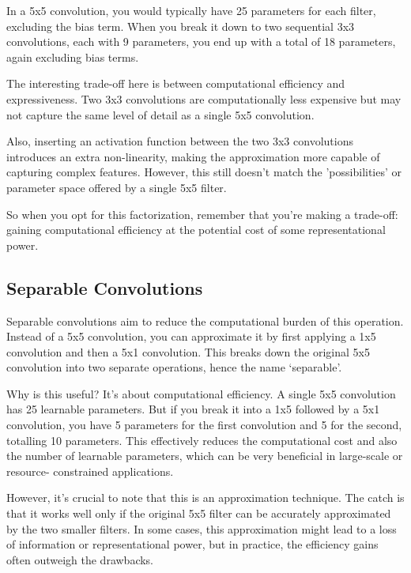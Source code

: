\documentclass[11pt]{article}
\begin{document}
In a 5x5 convolution, you would typically have 25 parameters for each filter, excluding the bias term. When you break it down to two sequential 3x3 convolutions, each with 9 parameters, you end up with a total of 18 parameters, again excluding bias terms. 

The interesting trade-off here is between computational efficiency and expressiveness. Two 3x3 convolutions are computationally less expensive but may not capture the same level of detail as a single 5x5 convolution. 

Also, inserting an activation function between the two 3x3 convolutions introduces an extra non-linearity, making the approximation more capable of capturing complex features. However, this still doesn't match the 'possibilities' or parameter space offered by a single 5x5 filter. 

So when you opt for this factorization, remember that you're making a trade-off: gaining computational efficiency at the potential cost of some representational power.

\subsection{Separable Convolutions}

Separable convolutions aim to reduce the computational burden of this operation. Instead of a 5x5 convolution, you can approximate it by first applying a 1x5 convolution and then a 5x1 convolution. This breaks down the original 5x5 convolution into two separate operations, hence the name `separable'. 

Why is this useful? It's about computational efficiency. A single 5x5 convolution has 25 learnable parameters. But if you break it into a 1x5 followed by a 5x1 convolution, you have 5 parameters for the first convolution and 5 for the second, totalling 10 parameters. This effectively reduces the computational cost and also the number of learnable parameters, which can be very beneficial in large-scale or resource- constrained applications. 

However, it's crucial to note that this is an approximation technique. The catch is that it works well only if the original 5x5 filter can be accurately approximated by the two smaller filters. In some cases, this approximation might lead to a loss of information or representational power, but in practice, the efficiency gains often outweigh the drawbacks.

\end{document}
